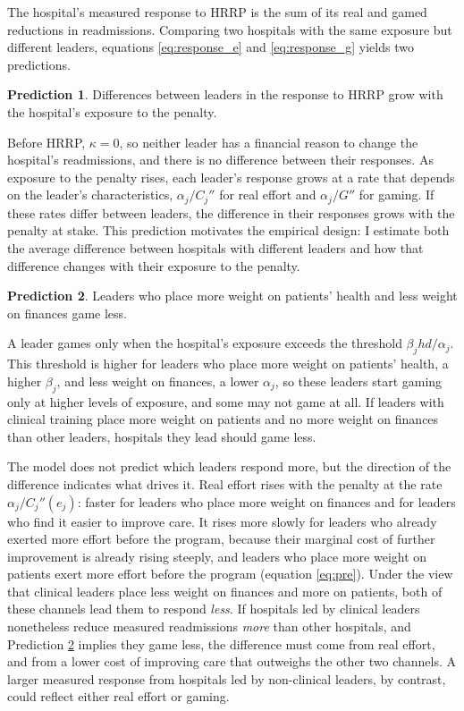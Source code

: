 \documentclass[12pt]{article}
\theoremstyle{definition}   %
\newtheorem{prediction}{Prediction}
\begin{document}
    The hospital's measured response to HRRP is the sum of its real and gamed reductions in readmissions. Comparing two hospitals with the same exposure but different leaders, equations \eqref{eq:response_e} and \eqref{eq:response_g} yields two predictions.
 
    \begin{prediction}\label{pred:exposure}
        Differences between leaders in the response to HRRP grow with the hospital's exposure to the penalty.
    \end{prediction}
 
    Before HRRP, $\kappa = 0$, so neither leader has a financial reason to change the hospital's readmissions, and there is no difference between their responses. As exposure to the penalty rises, each leader's response grows at a rate that depends on the leader's characteristics, $\alpha_j / C_j''$ for real effort and $\alpha_j / G''$ for gaming. If these rates differ between leaders, the difference in their responses grows with the penalty at stake. This prediction motivates the empirical design: I estimate both the average difference between hospitals with different leaders and how that difference changes with their exposure to the penalty.
 
    \begin{prediction}\label{pred:gaming}
        Leaders who place more weight on patients' health and less weight on finances game less.
    \end{prediction}
 
    A leader games only when the hospital's exposure exceeds the threshold $\beta_j h d / \alpha_j$. This threshold is higher for leaders who place more weight on patients' health, a higher $\beta_j$, and less weight on finances, a lower $\alpha_j$, so these leaders start gaming only at higher levels of exposure, and some may not game at all. If leaders with clinical training place more weight on patients and no more weight on finances than other leaders, hospitals they lead should game less.
 
    The model does not predict which leaders respond more, but the direction of the difference indicates what drives it. Real effort rises with the penalty at the rate $\alpha_j / C_j''(e_j)$: faster for leaders who place more weight on finances and for leaders who find it easier to improve care. It rises more slowly for leaders who already exerted more effort before the program, because their marginal cost of further improvement is already rising steeply, and leaders who place more weight on patients exert more effort before the program (equation \ref{eq:pre}). Under the view that clinical leaders place less weight on finances and more on patients, both of these channels lead them to respond \emph{less}. If hospitals led by clinical leaders nonetheless reduce measured readmissions \emph{more} than other hospitals, and Prediction \ref{pred:gaming} implies they game less, the difference must come from real effort, and from a lower cost of improving care that outweighs the other two channels. A larger measured response from hospitals led by non-clinical leaders, by contrast, could reflect either real effort or gaming.
 
\end{document}
